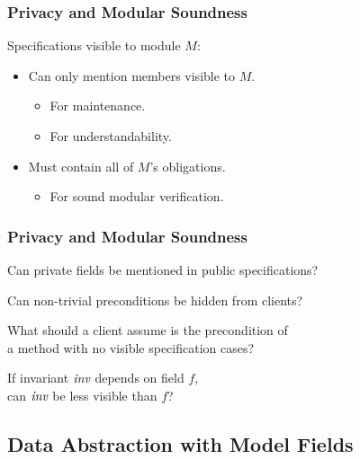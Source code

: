 \begin{frame}
\frametitle{Privacy and Modular Soundness}
Specifications visible to module $M$:
\begin{itemize}
\item
Can only mention members visible to $M$.
\begin{itemize}
\item
For maintenance.

\item
For understandability.
\end{itemize}

\item
Must contain all of $M$'s obligations.
\begin{itemize}
\item
For sound modular verification.
\end{itemize}
\end{itemize}
\end{frame}

\begin{frame}
\frametitle{Privacy and Modular Soundness}
\begin{question}
Can private fields be mentioned in public specifications?
\end{question}

\pause
\begin{question}
Can non-trivial preconditions be hidden from clients?
\end{question}

\pause
\begin{question}
What should a client assume is the precondition of \\
a method with no visible specification cases?
\end{question}

\pause
\begin{question}
If invariant ${\textit{inv}}$ depends on field $f$, \\
can ${\textit{inv}}$ be less visible than $f$?
\end{question}
\end{frame}

\subsection[Model]{Data Abstraction with Model Fields}

